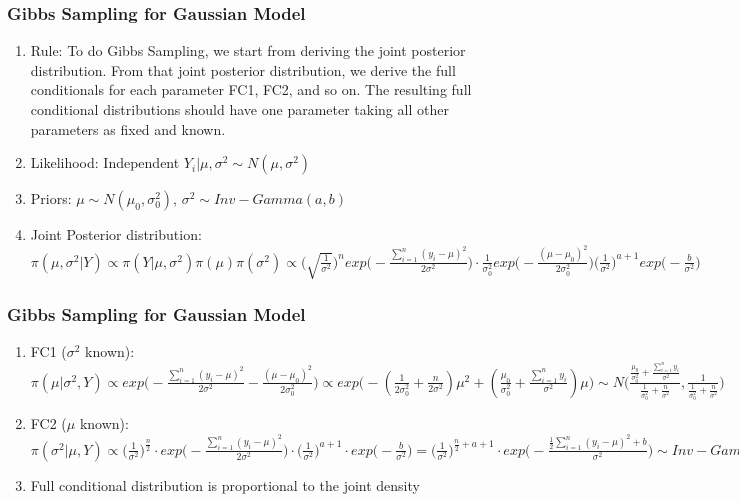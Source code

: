 \documentclass{beamer}
\begin{document}

\begin{frame}
\frametitle{Gibbs Sampling for Gaussian Model}

\begin{enumerate}
\item Rule: To do Gibbs Sampling, we start from deriving the joint posterior distribution. From that joint posterior distribution, we derive the full conditionals for each parameter FC1, FC2, and so on. The resulting full conditional distributions should have one parameter taking all other parameters as fixed and known. 

\item Likelihood: Independent $Y_i| \mu,\sigma^2 \sim N(\mu,\sigma^2)$
\item Priors: $\mu \sim N(\mu_0,\sigma_0^2)$, $\sigma^2 \sim Inv-Gamma(a,b)$
\item Joint Posterior distribution: $\pi(\mu,\sigma^2|Y) \propto \pi(Y|\mu,\sigma^2) \pi(\mu) \pi(\sigma^2) \propto \Big(\sqrt{\frac{1}{\sigma^2}}\Big)^n exp \Big(-\frac{\sum_{i=1}^n(y_i -\mu)^2}{2\sigma^2}\Big) \cdot \frac{1}{\sigma_0^2} exp\Big(-\frac{(\mu-\mu_0)^2}{2\sigma_0^2}\Big) \Big(\frac{1}{\sigma^2}\Big)^{a+1}exp\Big(-\frac{b}{\sigma^2}\Big)$

\end{enumerate}

\end{frame}


\begin{frame}
\frametitle{Gibbs Sampling for Gaussian Model}

\begin{enumerate}
\item FC1 ($\sigma^2$ known): $\pi(\mu|\sigma^2,Y) \propto exp\Big(-\frac{\sum_{i=1}^n(y_i-\mu)^2}{2\sigma^2} - \frac{(\mu-\mu_0)^2}{2\sigma_0^2}\Big) \propto exp\Big(-(\frac{1}{2\sigma^2_0} + \frac{n}{2\sigma^2}) \mu^2 + (\frac{\mu_0}{\sigma_0^2} + \frac{\sum_{i=1}^n y_i}{\sigma^2})\mu\Big) \sim N\Big(\frac{\frac{\mu_0}{\sigma_0^2} + \frac{\sum_{i=1}^n y_i}{\sigma^2}}{\frac{1}{\sigma^2_0} + \frac{n}{\sigma^2}}, \frac{1}{\frac{1}{\sigma^2_0} + \frac{n}{\sigma^2}}\Big)$

\item FC2 ($\mu$ known): $\pi(\sigma^2|\mu,Y) \propto \Big(\frac{1}{\sigma^2}\Big)^{\frac{n}{2}} \cdot exp\Big(-\frac{\sum_{i=1}^n(y_i-\mu)^2}{2\sigma^2}\Big) \cdot \Big(\frac{1}{\sigma^2}\Big)^{a+1} \cdot exp\Big(-\frac{b}{\sigma^2}\Big) = \Big(\frac{1}{\sigma^2}\Big)^{\frac{n}{2}+a+1} \cdot exp\Big(-\frac{\frac{1}{2}\sum_{i=1}^n(y_i-\mu)^2 + b}{\sigma^2}\Big) \sim Inv-Gamma\Big(\frac{n}{2}+a, \frac{1}{2}\sum_{i=1}^n(y_i-\mu)^2 + b\Big)$

\item Full conditional distribution is proportional to the joint density

\end{enumerate}

\end{frame}
\end{document}
